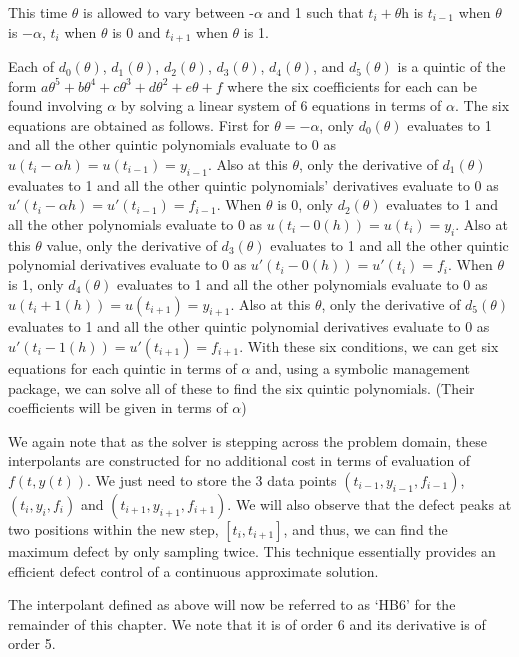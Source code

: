 \documentclass{article}
\begin{document}
This time $\theta$ is allowed to vary between -$\alpha$ and 1 such that $t_i + \theta$h is $t_{i - 1}$ when $\theta$ is $-\alpha$, $t_i$ when $\theta$ is 0 and $t_{i + 1}$ when $\theta$ is 1.

Each of $d_0(\theta)$, $d_1(\theta)$, $d_2(\theta)$, $d_3(\theta)$, $d_4(\theta)$, and $d_5(\theta)$ is a quintic of the form $a\theta^5 + b\theta^4 + c\theta^3 + d\theta^2 + e\theta + f$ where the six coefficients for each can be found involving $\alpha$ by solving a linear system of 6 equations in terms of $\alpha$. The six equations are obtained as follows. First for $\theta = -\alpha$, only $d_0(\theta)$ evaluates to 1 and all the other quintic polynomials evaluate to 0 as $u(t_i - \alpha h) = u(t_{i - 1}) = y_{i - 1}$. Also at this $\theta$, only the derivative of $d_1(\theta)$ evaluates to 1 and all the other quintic polynomials' derivatives evaluate to 0 as $u'(t_i - \alpha h) = u'(t_{i - 1}) = f_{i - 1}$. When $\theta$ is 0, only $d_2(\theta)$ evaluates to 1 and all the other polynomials evaluate to 0 as $u(t_i - 0(h)) = u(t_i) = y_i$. Also at this $\theta$ value, only the derivative of $d_3(\theta)$ evaluates to 1 and all the other quintic polynomial derivatives evaluate to 0 as $u'(t_i - 0(h)) = u'(t_i) = f_i$. When $\theta$ is 1, only $d_4(\theta)$ evaluates to 1 and all the other polynomials evaluate to 0 as $u(t_i + 1(h)) = u(t_{i+1}) = y_{i+1}$. Also at this $\theta$, only the derivative of $d_5(\theta)$ evaluates to 1 and all the other quintic polynomial derivatives evaluate to 0 as $u'(t_i - 1(h)) = u'(t_{i+1}) = f_{i+1}$. With these six conditions, we can get six equations for each quintic in terms of $\alpha$ and, using a symbolic management package, we can solve all of these to find the six quintic polynomials. (Their coefficients will be given in terms of $\alpha$)

We again note that as the solver is stepping across the problem domain, these interpolants are constructed for no additional cost in terms of evaluation of $f(t, y(t))$. We just need to store the 3 data points $(t_{i-1}, y_{i - 1}, f_{i - 1})$, $(t_i, y_i, f_i)$ and $(t_{i + 1}, y_{i + 1}, f_{i + 1})$. We will also observe that the defect peaks at two positions within the new step, $[t_i, t_{i+1}]$, and thus, we can find the maximum defect by only sampling twice. This technique essentially provides an efficient defect control of a continuous approximate solution.

The interpolant defined as above will now be referred to as `HB6' for the remainder of this chapter. We note that it is of order 6 and its derivative is of order 5.
\end{document}
